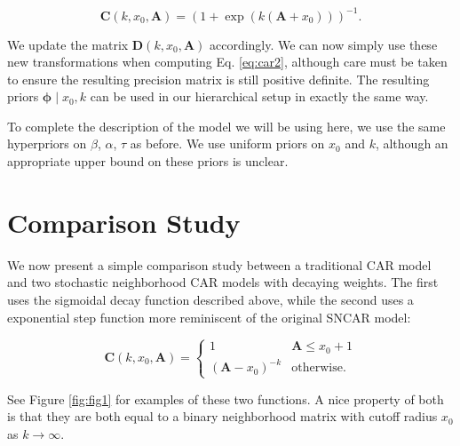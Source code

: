 \documentclass{scrartcl}
\newcommand{\todo}[1]{\textcolor{red}{TODO:
    #1}\PackageWarning{TODO:}{#1!}}
\newcommand{\mat}[1]{\bm{#1}}
\begin{document}
\begin{equation}
  \label{eq:decay-mat1}
  \mat{C}(k, x_0, \mat{A}) = (1 + \exp(k (\mat{A} + x_0)))^{-1}.
\end{equation}

We update the matrix $\mat{D}(k, x_0, \mat{A})$ accordingly. We can
now simply use these new transformations when computing
Eq. \eqref{eq:car2}, although care must be taken to ensure the
resulting precision matrix is still positive definite. The resulting
priors $\mat{\phi} \mid x_0, k$ can be used in our hierarchical setup
in exactly the same way.

To complete the description of the model we will be using here, we use
the same hyperpriors on $\beta$, $\alpha$, $\tau$ as before. We use
uniform priors on $x_0$ and $k$, although an appropriate upper bound
on these priors is unclear. %



\section{Comparison Study}
\label{sec:simulation-study}

We now present a simple comparison study between a traditional CAR
model and two stochastic neighborhood CAR models with decaying
weights. The first uses the sigmoidal decay function described above,
while the second uses a exponential step function more reminiscent of
the original SNCAR model:

\begin{equation}
  \label{eq:decay-mat2}
  \mat{C}(k, x_0, \mat{A}) =
  \begin{cases}
    1 & \mat{A} \leq x_0 + 1\\
    (\mat{A} - x_0)^{-k} & \text{otherwise.}
  \end{cases}
\end{equation}

See Figure \ref{fig:fig1} for examples of these two functions. A nice
property of both is that they are both equal to a binary neighborhood
matrix with cutoff radius $x_0$ as $k \rightarrow\infty$.
\end{document}
